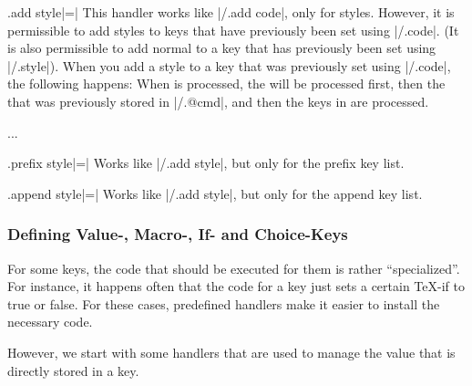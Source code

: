 \begin{handler}{{.add style}|=|}
    This handler works like |/.add code|, only for styles. However, it is
    permissible to add styles to keys that have previously been set using
    |/.code|. (It is also permissible to add normal  to a key that
    has previously been set using |/.style|). When you add a style to a key
    that was previously set using |/.code|, the following happens: When
     is processed, the  will be processed
    first, then the  that was previously stored in
    |/.@cmd|, and then the keys in  are
    processed.
\begin{codeexample}
...
\end{codeexample}
\end{handler}

\begin{handler}{{.prefix style}|=|}
    Works like |/.add style|, but only for the prefix key list.
\end{handler}

\begin{handler}{{.append style}|=|}
    Works like |/.add style|, but only for the append key list.
\end{handler}


\subsubsection{Defining Value-, Macro-, If- and Choice-Keys}

For some keys, the code that should be executed for them is rather
``specialized''. For instance, it happens often that the code for a key just
sets a certain \TeX-if to true or false. For these cases, predefined handlers
make it easier to install the necessary code.

However, we start with some handlers that are used to manage the value that is
directly stored in a key.

